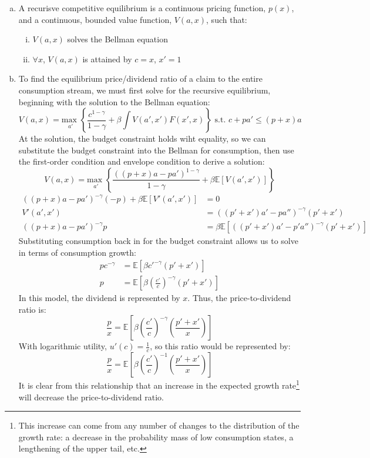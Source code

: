 \documentclass{article}
\newcommand{\usmax}[1]{\underset{#1}{\text{max }}}
\newcommand{\E}[1]{\mathbb{E}\left[#1\right]} %
\begin{document}
\begin{enumerate}[(a)]
	\item A recurisve competitive equilibrium is a continuous pricing function, $p(x)$, and a continuous, bounded value function, $V(a,x)$, such that:
		\begin{enumerate}[(i)]
			\item $V(a,x)$ solves the Bellman equation 
			\item $\forall x$, $V(a,x)$ is attained by $c=x$, $x'=1$
		\end{enumerate}
	
	\item To find the equilibrium price/dividend ratio of a claim to the entire consumption stream, we must first solve for the recursive equilibrium, beginning with the solution to the Bellman equation:
		\[
			V(a,x) = \usmax{a'}\left\{\frac{c^{1-\gamma}}{1-\gamma} + \beta\int V(a',x')F(x',x)\right\}\text{ s.t. } c+pa' \leq (p+x)a
		\]
		At the solution, the budget constraint holds wiht equality, so we can substitute the budget constraint into the Bellman for consumption, then use the first-order condition and envelope condition to derive a solution:
		\[
			V(a,x) = \usmax{a'}\left\{\frac{\left((p+x)a-pa'\right)^{1-\gamma}}{1-\gamma} + \beta\E{V(a',x')}\right\}
		\]
		\begin{align*}
			\left((p+x)a-pa'\right)^{-\gamma}(-p) + \beta\E{V'(a',x')} &= 0	\\
			V'(a',x') &= \left((p'+x')a'-pa''\right)^{-\gamma}(p'+x')						\\
			\left((p+x)a-pa'\right)^{-\gamma}p &= \beta\E{\left((p'+x')a'-p'a''\right)^{-\gamma}(p'+x')}
		\end{align*}
		Substituting consumption back in for the budget constraint allows us to solve in terms of consumption growth:
		\begin{align*}
			pc^{-\gamma} &= \E{\beta c'^{-\gamma}(p'+x')}	\\
			p &= \E{\beta \left(\frac{c'}{c}\right)^{-\gamma}(p'+x')}
		\end{align*}
		In this model, the dividend is represented by $x$. Thus, the price-to-dividend ratio is:
		\[
			\frac{p}{x} = \E{\beta \left(\frac{c'}{c}\right)^{-\gamma}\left(\frac{p'+x'}{x}\right)}
		\]
		With logarithmic utility, ${u'(c)=\frac{1}{c}}$, so this ratio would be represented by:
		\[
			\frac{p}{x} = \E{\beta \left(\frac{c'}{c}\right)^{-1}\left(\frac{p'+x'}{x}\right)}
		\]
		It is clear from this relationship that an increase in the expected growth rate\footnote{This increase can come from any number of changes to the distribution of the growth rate: a decrease in the probability mass of low consumption states, a lengthening of the upper tail, etc.} will decrease the price-to-dividend ratio.
		

\end{enumerate}
\end{document}
